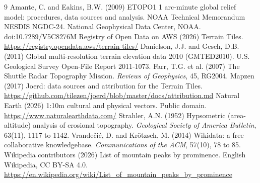 \documentclass[11pt,a4paper]{article}
\begin{document}
\begin{thebibliography}{9}
 Amante, C. and Eakins, B.W. (2009) ETOPO1 1 arc-minute global relief model: procedures, data sources and analysis. NOAA Technical Memorandum NESDIS NGDC-24. National Geophysical Data Center, NOAA. doi:10.7289/V5C8276M
 Registry of Open Data on AWS (2026) Terrain Tiles. \url{https://registry.opendata.aws/terrain-tiles/}
 Danielson, J.J. and Gesch, D.B. (2011) Global multi-resolution terrain elevation data 2010 (GMTED2010). U.S. Geological Survey Open-File Report 2011-1073.
 Farr, T.G. et al. (2007) The Shuttle Radar Topography Mission. \emph{Reviews of Geophysics}, 45, RG2004.
 Mapzen (2017) Joerd: data sources and attribution for the Terrain Tiles. \url{https://github.com/tilezen/joerd/blob/master/docs/attribution.md}
 Natural Earth (2026) 1:10m cultural and physical vectors. Public domain. \url{https://www.naturalearthdata.com/}
 Strahler, A.N. (1952) Hypsometric (area-altitude) analysis of erosional topography. \emph{Geological Society of America Bulletin}, 63(11), 1117 to 1142.
 Vrandečić, D. and Krötzsch, M. (2014) Wikidata: a free collaborative knowledgebase. \emph{Communications of the ACM}, 57(10), 78 to 85.
 Wikipedia contributors (2026) List of mountain peaks by prominence. English Wikipedia, CC BY-SA 4.0. \url{https://en.wikipedia.org/wiki/List_of_mountain_peaks_by_prominence}
\end{thebibliography}
\end{document}
